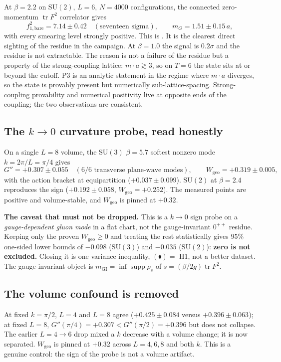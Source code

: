 At $\beta=2.2$ on $\mathrm{SU}(2)$, $L=6$, $N=4000$ configurations, the connected zero-momentum
$\operatorname{tr}F^2$ correlator gives
\[
f_{1,\mathrm{bare}}^2=7.14\pm0.42\quad(\text{seventeen sigma}),\qquad
m_G=1.51\pm0.15\,a ,
\]
with every smearing level strongly positive. This is \LE. It is the clearest direct sighting of
the residue in the campaign. At $\beta=1.0$ the signal is $0.2\sigma$ and the residue is not
extractable. The reason is not a failure of the residue but a property of the strong-coupling
lattice: $m\cdot a\gtrsim3$, so on $T=6$ the state sits at or beyond the cutoff. P3 is an
analytic statement in the regime where $m\cdot a$ diverges, so the state is provably present but
numerically sub-lattice-spacing. Strong-coupling provability and numerical positivity live at
opposite ends of the coupling; the two observations are consistent.

\subsection{The $k\to0$ curvature probe, read honestly}

On a single $L=8$ volume, the $\mathrm{SU}(3)$ $\beta=5.7$ softest nonzero mode
$k=2\pi/L=\pi/4$ gives
\[
G''=+0.307\pm0.055\quad(\text{6/6 transverse plane-wave modes}),\qquad
W_{\mathrm{geo}}=+0.319\pm0.005 ,
\]
with the action bracket at equipartition ($+0.037\pm0.099$). $\mathrm{SU}(2)$ at $\beta=2.4$
reproduces the sign ($+0.192\pm0.058$, $W_{\mathrm{geo}}=+0.252$). The measured points are
positive and volume-stable, and $W_{\mathrm{geo}}$ is pinned at $+0.32$.

\textbf{The caveat that must not be dropped.} This is a $k\to0$ sign probe on a
\emph{gauge-dependent gluon mode} in a flat chart, not the gauge-invariant $0^{++}$ residue.
Keeping only the proven $W_{\mathrm{geo}}\ge0$ and treating the rest statistically gives $95\%$
one-sided lower bounds of $-0.098$ ($\mathrm{SU}(3)$) and $-0.035$ ($\mathrm{SU}(2)$):
\textbf{zero is not excluded.} Closing it is one variance inequality, $(\blacklozenge)=$ H1, not
a better dataset. The gauge-invariant object is
$m_{\mathrm{GI}}=\inf\operatorname{supp}\rho_s$ of $s=(\beta/2g)\operatorname{tr}F^2$.

\subsection{The volume confound is removed}

At fixed $k=\pi/2$, $L=4$ and $L=8$ agree ($+0.425\pm0.084$ versus $+0.396\pm0.063$); at fixed
$L=8$, $G''(\pi/4)=+0.307<G''(\pi/2)=+0.396$ but does not collapse. The earlier $L=4\to6$ drop
mixed a $k$ decrease with a volume change; it is now separated. $W_{\mathrm{geo}}$ is pinned at
$+0.32$ across $L=4,6,8$ and both $k$. This is a genuine control: the sign of the probe is not a
volume artifact.

